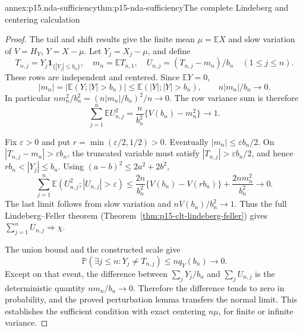 \begin{annexitem}{annex:p15.nda-sufficiency}{thm:p15-nda-sufficiency}{The complete Lindeberg and centering calculation}
\begin{proof}
The tail and shift results give the finite mean \(\mu=\mathbb EX\)
and slow variation of \(V=H_Y\), \(Y=X-\mu\).
Let \(Y_j=X_j-\mu\), and define
\[
 T_{n,j}=Y_j\mathbf1_{\{|Y_j|\leq b_n\}},\quad
 m_n=\mathbb ET_{n,1},\quad
 U_{n,j}=(T_{n,j}-m_n)/b_n\quad(1\leq j\leq n).
 \]
These rows are independent and centered.
Since \(\mathbb EY=0\),
\[
 |m_n|=|\mathbb E(Y;|Y|>b_n)|
 \leq\mathbb E(|Y|;|Y|>b_n),\qquad
 n|m_n|/b_n\to0.
 \]
In particular \(nm_n^2/b_n^2=(n|m_n|/b_n)^2/n\to0\).
The row variance sum is therefore
\[
 \sum_{j=1}^n\mathbb EU_{n,j}^2
   =\frac n{b_n^2}\{V(b_n)-m_n^2\}\to1.
 \]

Fix \(\varepsilon>0\) and put
\(r=\min(\varepsilon/2,1/2)>0\).
Eventually \(|m_n|\leq\varepsilon b_n/2\).
On \(|T_{n,j}-m_n|>\varepsilon b_n\), the truncated variable
must satisfy \(|T_{n,j}|>\varepsilon b_n/2\), and hence
\(rb_n<|Y_j|\leq b_n\). Using
\((a-b)^2\leq2a^2+2b^2\),
\[
 \sum_{j=1}^n\mathbb E(U_{n,j}^2;|U_{n,j}|>\varepsilon)
 \leq \frac{2n}{b_n^2}\{V(b_n)-V(rb_n)\}
                              +\frac{2nm_n^2}{b_n^2}\to0.
 \]
The last limit follows from slow variation and
\(nV(b_n)/b_n^2\to1\). Thus the full Lindeberg--Feller theorem
(Theorem~\ref{thm:p15-clt-lindeberg-feller}) gives
\(\sum_{j=1}^nU_{n,j}\Rightarrow\chi\).

The union bound and the constructed scale give
\[
 \mathbb P(\exists j\leq n:Y_j\ne T_{n,j})
 \leq nq_Y(b_n)\to0.
 \]
Except on that event, the difference between
\(\sum_jY_j/b_n\) and \(\sum_jU_{n,j}\) is the deterministic
quantity \(nm_n/b_n\to0\).
Therefore the difference tends to zero in probability, and the
proved perturbation lemma transfers the normal limit.
This establishes the sufficient condition with exact centering
\(n\mu\), for finite or infinite variance.
\end{proof}
\end{annexitem}

